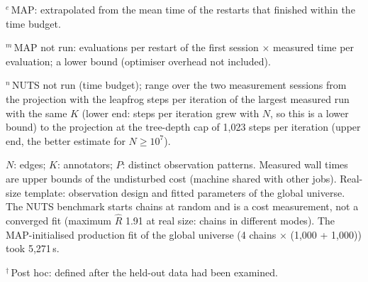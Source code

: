 \begin{table}[tbp]
\begin{minipage}{\linewidth}
$^{e}$\,MAP: extrapolated from the mean time of the restarts that finished within the time budget.

$^{m}$\,MAP not run: evaluations per restart of the first session $\times$ measured time per evaluation; a lower bound (optimiser overhead not included).

$^{n}$\,NUTS not run (time budget); range over the two measurement sessions from the projection with the leapfrog steps per iteration of the largest measured run with the same $K$ (lower end: steps per iteration grew with $N$, so this is a lower bound) to the projection at the tree-depth cap of 1{,}023 steps per iteration (upper end, the better estimate for $N \geq 10^7$).

$N$: edges; $K$: annotators; $P$: distinct observation patterns. Measured wall times are upper bounds of the undisturbed cost (machine shared with other jobs). Real-size template: observation design and fitted parameters of the global universe. The NUTS benchmark starts chains at random and is a cost measurement, not a converged fit (maximum $\widehat R$ 1.91 at real size: chains in different modes). The MAP-initialised production fit of the global universe (4 chains $\times$ (1{,}000 + 1{,}000)) took 5{,}271\,s.

$^{\dagger}$\,Post hoc: defined after the held-out data had been examined.
\end{minipage}
\end{table}
